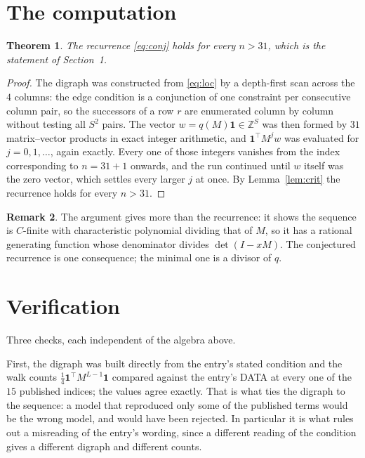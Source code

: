 \documentclass[11pt,a4paper]{article}
\theoremstyle{plain}
\newtheorem{theorem}{Theorem}
\theoremstyle{definition}
\newtheorem{remark}[theorem]{Remark}
\begin{document}
\section{The computation}

\begin{theorem}
The recurrence \eqref{eq:conj} holds for every $n>31$, which is the statement of
Section~1.
\end{theorem}

\begin{proof}
The digraph was constructed from \eqref{eq:loc} by a depth-first scan across the $4$
columns: the edge condition is a conjunction of one constraint per consecutive column
pair, so the successors of a row $r$ are enumerated column by column without testing all
$S^2$ pairs. The vector $w=q(M)\mathbf{1}\in\mathbb{Z}^{S}$ was then formed by $31$
matrix--vector products in exact integer arithmetic, and $\mathbf{1}^{\!\top}M^{j}w$ was
evaluated for $j=0,1,\dots$, again exactly. Every one of those integers vanishes from the
index corresponding to $n=31+1$ onwards, and the run continued until $w$ itself was the
zero vector, which settles every larger $j$ at once. By Lemma~\ref{lem:crit} the recurrence
holds for every $n>31$.
\end{proof}

\begin{remark}
The argument gives more than the recurrence: it shows the sequence is $C$-finite with
characteristic polynomial dividing that of $M$, so it has a rational generating function
whose denominator divides $\det(I-xM)$. The conjectured recurrence is one consequence; the
minimal one is a divisor of $q$.
\end{remark}

\section{Verification}

Three checks, each independent of the algebra above.

First, the digraph was built directly from the entry's stated condition and the walk counts
$\tfrac1{4}\mathbf{1}^{\!\top}M^{L-1}\mathbf{1}$ compared against the entry's DATA at
every one of the $15$ published indices; the values agree exactly. That is what ties
the digraph to the sequence: a model that reproduced only some of the published terms would
be the wrong model, and would have been rejected. In particular it is what rules out a
misreading of the entry's wording, since a different reading of the condition gives a
different digraph and different counts.
\end{document}
